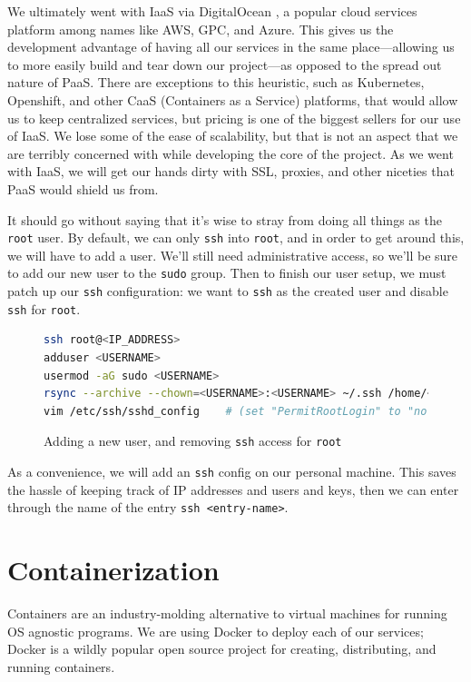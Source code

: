 \documentclass[11pt, twoside, reqno]{book}
\begin{document}
We ultimately went with IaaS via DigitalOcean \cite{DigitalO1:online}, a popular cloud services platform among names like AWS, GPC, and Azure. This gives us the development advantage of having all our services in the same place—allowing us to more easily build and tear down our project—as opposed to the spread out nature of PaaS. There are exceptions to this heuristic, such as Kubernetes, Openshift, and other CaaS (Containers as a Service) platforms, that would allow us to keep centralized services, but pricing is one of the biggest sellers for our use of IaaS. We lose some of the ease of scalability, but that is not an aspect that we are terribly concerned with while developing the core of the project. As we went with IaaS, we will get our hands dirty with SSL, proxies, and other niceties that PaaS would shield us from.

It should go without saying that it's wise to stray from doing all things as the \texttt{root} user. By default, we can only \texttt{ssh} into \texttt{root}, and in order to get around this, we will have to add a user. We'll still need administrative access, so we'll be sure to add our new user to the \texttt{sudo} group. Then to finish our user setup, we must patch up our \texttt{ssh} configuration: we want to \texttt{ssh} as the created user and disable \texttt{ssh} for \texttt{root}.

\begin{figure}[h!]
\begin{lstlisting}[language=sh]
ssh root@<IP_ADDRESS>
adduser <USERNAME>
usermod -aG sudo <USERNAME> 
rsync --archive --chown=<USERNAME>:<USERNAME> ~/.ssh /home/<USERNAME> 
vim /etc/ssh/sshd_config    # (set "PermitRootLogin" to "no")
\end{lstlisting}
\caption{Adding a new user, and removing \texttt{ssh} access for \texttt{root}}
\end{figure}

As a convenience, we will add an \texttt{ssh} config on our personal machine. This saves the hassle of keeping track of IP addresses and users and keys, then we can enter through the name of the entry \texttt{ssh <entry-name>}.

\section{Containerization}

Containers are an industry-molding alternative to virtual machines for running OS agnostic programs. We are using Docker to deploy each of our services; Docker is a wildly popular open source project for creating, distributing, and running containers.
\end{document}
